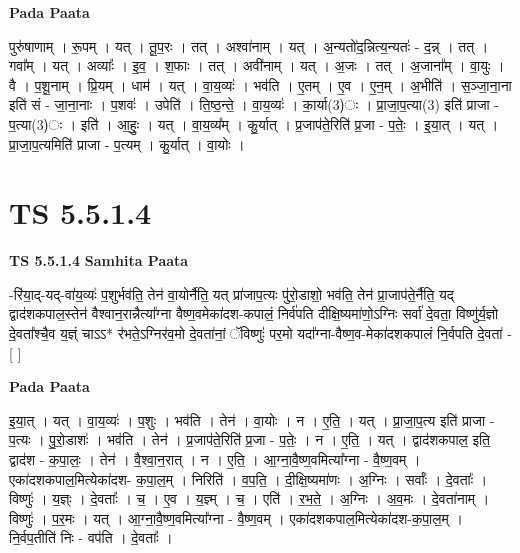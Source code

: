 \documentclass[17pt]{extarticle}
\begin{document}
\textbf{Pada Paata} \newline

पुरु॑षाणाम् । रू॒पम् । यत् । तू॒प॒रः । तत् । अश्वा॑नाम् । यत् । अ॒न्यतो॑द॒न्नित्य॒न्यतः॑ - द॒न्न् । तत् । गवा᳚म् । यत् । अव्याः᳚ । इ॒व॒ । श॒फाः । तत् । अवी॑नाम् । यत् । अ॒जः । तत् । अ॒जाना᳚म् । वा॒युः । वै । प॒शू॒नाम् । प्रि॒यम् । धाम॑ । यत् । वा॒य॒व्यः॑ । भव॑ति । ए॒तम् । ए॒व । ए॒न॒म् । अ॒भीति॑ । स॒ञ्जा॒ना॒ना इति॑ सं - जा॒ना॒नाः । प॒शवः॑ । उपेति॑ । ति॒ष्ठ॒न्ते॒ । वा॒य॒व्यः॑ । का॒र्या(3)ः । प्रा॒जा॒प॒त्या(3) इति॑ प्राजा - प॒त्या(3)ः । इति॑ । आ॒हुः॒ । यत् । वा॒य॒व्य᳚म् । कु॒र्यात् । प्र॒जाप॑ते॒रिति॑ प्र॒जा - प॒तेः॒ । इ॒या॒त् । यत् । प्रा॒जा॒प॒त्यमिति॑ प्राजा - प॒त्यम् । कु॒र्यात् । वा॒योः ।  \newline





\section{ TS 5.5.1.4 }

\textbf{TS 5.5.1.4 } \newline
\textbf{Samhita Paata} \newline

-रि॑या॒द्-यद्-वा॑य॒व्यः॑ प॒शुर्भव॑ति॒ तेन॑ वा॒योर्नैति॒ यत् प्रा॑जाप॒त्यः पु॑रो॒डाशो॒ भव॑ति॒ तेन॑ प्रा॒जाप॑ते॒र्नैति॒ यद् द्वाद॑शकपाल॒स्तेन॑ वैश्वान॒रान्नैत्या᳚ग्ना वैष्ण॒वमेका॑दश-कपालं॒ निर्व॑पति दीक्षि॒ष्यमा॑णो॒ऽग्निः सर्वा॑ दे॒वता॒ विष्णु॑र्य॒ज्ञो दे॒वता᳚श्चै॒व य॒ज्ञ्ं चाऽऽ* र॑भते॒ऽग्निर॑व॒मो दे॒वता॑नां॒ ॅविष्णुः॑ पर॒मो यदा᳚ग्ना-वैष्ण॒व-मेका॑दशकपालं नि॒र्वपति दे॒वता॑ - [  ] \newline

\textbf{Pada Paata} \newline

इ॒या॒त् । यत् । वा॒य॒व्यः॑ । प॒शुः । भव॑ति । तेन॑ । वा॒योः । न । ए॒ति॒ । यत् । प्रा॒जा॒प॒त्य इति॑ प्राजा - प॒त्यः । पु॒रो॒डाशः॑ । भव॑ति । तेन॑ । प्र॒जाप॑ते॒रिति॑ प्र॒जा - प॒तेः॒ । न । ए॒ति॒ । यत् । द्वाद॑शकपाल॒ इति॒ द्वाद॑श - क॒पा॒लः॒ । तेन॑ । वै॒श्वा॒न॒रात् । न । ए॒ति॒ । आ॒ग्ना॒वै॒ष्ण॒वमित्या᳚ग्ना - वै॒ष्ण॒वम् । एका॑दशकपाल॒मित्येका॑दश- क॒पा॒ल॒म् । निरिति॑ । व॒प॒ति॒ । दी॒क्षि॒ष्यमा॑णः । अ॒ग्निः । सर्वाः᳚ । दे॒वताः᳚ । विष्णुः॑ । य॒ज्ञ्ः । दे॒वताः᳚ । च॒ । ए॒व । य॒ज्ञ्म् । च॒ । एति॑ । र॒भ॒ते॒ । अ॒ग्निः । अ॒व॒मः । दे॒वता॑नाम् । विष्णुः॑ । प॒र॒मः । यत् । आ॒ग्ना॒वै॒ष्ण॒वमित्या᳚ग्ना - वै॒ष्ण॒वम् । एका॑दशकपाल॒मित्येका॑दश-क॒पा॒ल॒म् । नि॒र्वप॒तीति॑ निः - वप॑ति । दे॒वताः᳚ ।  \newline
\end{document}

